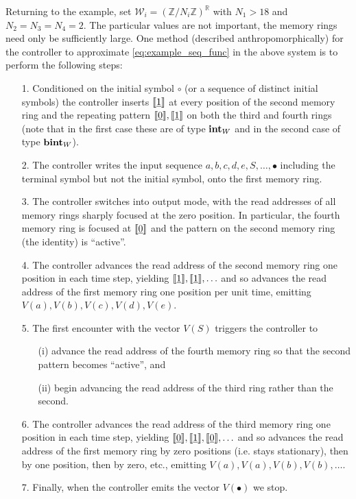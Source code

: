 \documentclass[english,letter paper,12pt,leqno]{article}
\theoremstyle{example}
\numberwithin{equation}{section}
\begin{document}
Returning to the example, set $\mathscr{W}_i = (\mathbb{Z}/N_i \mathbb{Z})^{\mathbb{R}}$ with $N_1 > 18$ and $N_2 = N_3 = N_4 = 2$. The particular values are not important, the memory rings need only be sufficiently large. One method (described anthropomorphically) for the controller to approximate \eqref{eq:example_seq_func} in the above system is to perform the following steps:
\begin{itemize}
\item[1.] Conditioned on the initial symbol $\circ$ (or a sequence of distinct initial symbols) the controller inserts $\llbracket \underline{1} \rrbracket$ at every position of the second memory ring and the repeating pattern $\llbracket \underline{0} \rrbracket, \llbracket \underline{1} \rrbracket$ on both the third and fourth rings (note that in the first case these are of type $\textbf{int}_W$ and in the second case of type $\textbf{bint}_W$).
\item[2.] The controller writes the input sequence $a,b,c,d,e,S,\ldots,\bullet$ including the terminal symbol but not the initial symbol, onto the first memory ring.
\item[3.] The controller switches into output mode, with the read addresses of all memory rings sharply focused at the zero position. In particular, the fourth memory ring is focused at $\llbracket \underline{0} \rrbracket$ and the pattern on the second memory ring (the identity) is ``active''.
\item[4.] The controller advances the read address of the second memory ring one position in each time step, yielding $\llbracket \underline{1} \rrbracket,\llbracket \underline{1} \rrbracket,\ldots$ and so advances the read address of the first memory ring one position per unit time, emitting $V(a),V(b),V(c),V(d),V(e)$.
\item[5.] The first encounter with the vector $V(S)$ triggers the controller to
\begin{itemize}
\item[(i)] advance the read address of the fourth memory ring so that the second pattern becomes ``active'', and
\item[(ii)] begin advancing the read address of the third ring rather than the second.
\end{itemize}
\item[6.] The controller advances the read address of the third memory ring one position in each time step, yielding $\llbracket \underline{0} \rrbracket,\llbracket \underline{1} \rrbracket,\llbracket \underline{0} \rrbracket,\ldots$ and so advances the read address of the first memory ring by zero positions (i.e. stays stationary), then by one position, then by zero, etc., emitting $V(a),V(a),V(b),V(b),\ldots$.
\item[7.] Finally, when the controller emits the vector $V(\bullet)$ we stop.
\end{itemize}
\end{document}

